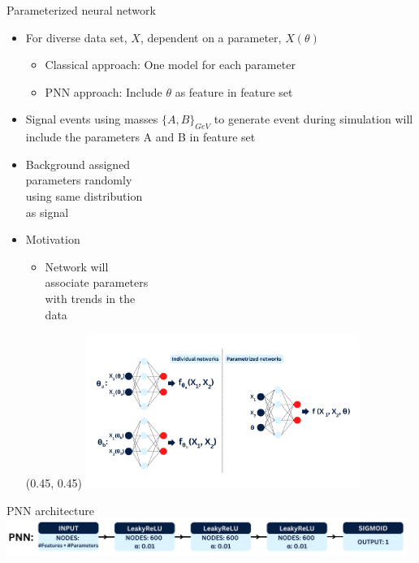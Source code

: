 \documentclass[UKenglish]{beamer}
\begin{document}
\begin{frame}{Parameterized neural network}
    \begin{itemize}
        \item For diverse data set, $X$, dependent on a parameter, $X(\theta)$
        \begin{itemize}
            \item Classical approach: One model for each parameter
            \item PNN approach: Include $\theta$ as feature in feature set
        \end{itemize}
        \item Signal events using masses $\{A,B\}_{GeV}$ to generate 
              event during simulation will include the parameters A and B
              in feature set
        \item Background assigned \\
              parameters randomly \\
              using same distribution\\ 
              as signal
        \item Motivation
        \begin{itemize}
            \item Network will \\
                  associate parameters\\
                  with trends in the \\
                  data
        \end{itemize}
        \begin{textblock}{0.8}(0.45, 0.45)
            \includegraphics[width = 0.7\textwidth]{figures/PNN.png}
        \end{textblock}
    \end{itemize}
\end{frame}
\begin{frame}{PNN architecture}
    \vfill
    \includegraphics[width = 0.98\textwidth]{figures/PNNArch.png}
\end{frame}
\end{document}
